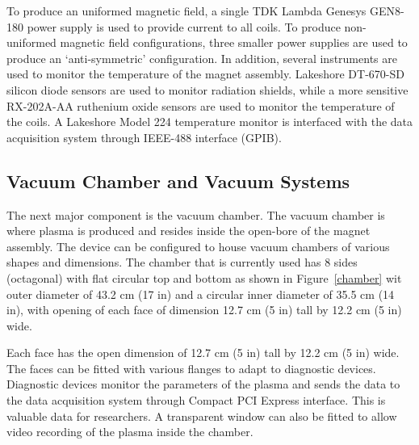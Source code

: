 To produce an uniformed magnetic field, a single TDK Lambda Genesys GEN8-180 power supply is used to provide current to all coils. To produce non-uniformed magnetic field configurations, three smaller power supplies are used to produce an `anti-symmetric' configuration. In addition, several instruments are used to monitor the temperature of the magnet assembly. Lakeshore DT-670-SD silicon diode sensors are used to monitor radiation shields, while a more sensitive RX-202A-AA ruthenium oxide sensors are used to monitor the temperature of the coils. A Lakeshore Model 224 temperature monitor is interfaced with the data acquisition system through IEEE-488 interface (GPIB).

\subsection{Vacuum Chamber and Vacuum Systems}

The next major component is the vacuum chamber. The vacuum chamber is where plasma is produced and resides inside the open-bore of the magnet assembly. The device can be configured to house vacuum chambers of various shapes and dimensions. The chamber that is currently used has 8 sides (octagonal) with flat circular top and bottom as shown in Figure~\ref{chamber} wit outer diameter of 43.2 cm (17 in) and a circular inner diameter of 35.5 cm (14 in), with opening of each face of dimension 12.7 cm (5 in) tall by 12.2 cm (5 in) wide.

Each face has the open dimension of 12.7 cm (5 in) tall by 12.2 cm (5 in) wide. The faces can be fitted with various flanges to adapt to diagnostic devices. Diagnostic devices monitor the parameters of the plasma and sends the data to the data acquisition system through Compact PCI Express interface. This is valuable data for researchers. A transparent window can also be fitted to allow video recording of the plasma inside the chamber.


